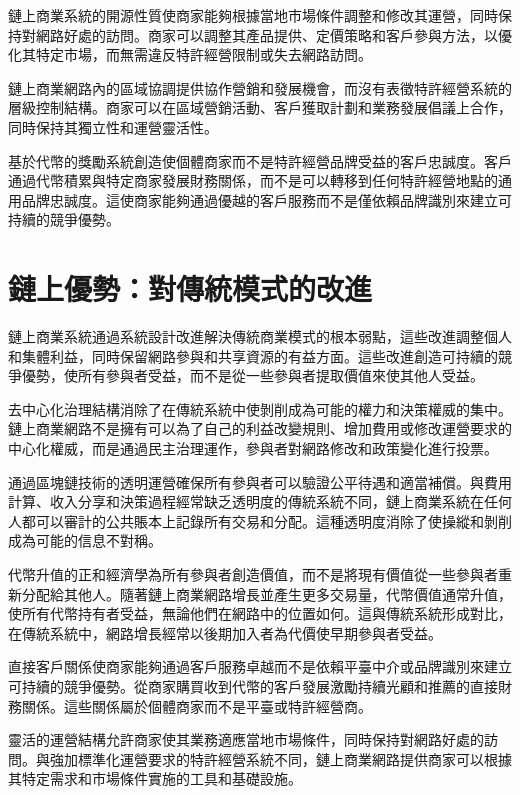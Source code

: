 \documentclass[
  Letterpaper,
]{scrbook}
\begin{document}
鏈上商業系統的開源性質使商家能夠根據當地市場條件調整和修改其運營，同時保持對網路好處的訪問。商家可以調整其產品提供、定價策略和客戶參與方法，以優化其特定市場，而無需違反特許經營限制或失去網路訪問。

鏈上商業網路內的區域協調提供協作營銷和發展機會，而沒有表徵特許經營系統的層級控制結構。商家可以在區域營銷活動、客戶獲取計劃和業務發展倡議上合作，同時保持其獨立性和運營靈活性。

基於代幣的獎勵系統創造使個體商家而不是特許經營品牌受益的客戶忠誠度。客戶通過代幣積累與特定商家發展財務關係，而不是可以轉移到任何特許經營地點的通用品牌忠誠度。這使商家能夠通過優越的客戶服務而不是僅依賴品牌識別來建立可持續的競爭優勢。

\section{鏈上優勢：對傳統模式的改進}\label{ux93c8ux4e0aux512aux52e2ux5c0dux50b3ux7d71ux6a21ux5f0fux7684ux6539ux9032}

鏈上商業系統通過系統設計改進解決傳統商業模式的根本弱點，這些改進調整個人和集體利益，同時保留網路參與和共享資源的有益方面。這些改進創造可持續的競爭優勢，使所有參與者受益，而不是從一些參與者提取價值來使其他人受益。

去中心化治理結構消除了在傳統系統中使剝削成為可能的權力和決策權威的集中。鏈上商業網路不是擁有可以為了自己的利益改變規則、增加費用或修改運營要求的中心化權威，而是通過民主治理運作，參與者對網路修改和政策變化進行投票。

通過區塊鏈技術的透明運營確保所有參與者可以驗證公平待遇和適當補償。與費用計算、收入分享和決策過程經常缺乏透明度的傳統系統不同，鏈上商業系統在任何人都可以審計的公共賬本上記錄所有交易和分配。這種透明度消除了使操縱和剝削成為可能的信息不對稱。

代幣升值的正和經濟學為所有參與者創造價值，而不是將現有價值從一些參與者重新分配給其他人。隨著鏈上商業網路增長並產生更多交易量，代幣價值通常升值，使所有代幣持有者受益，無論他們在網路中的位置如何。這與傳統系統形成對比，在傳統系統中，網路增長經常以後期加入者為代價使早期參與者受益。

直接客戶關係使商家能夠通過客戶服務卓越而不是依賴平臺中介或品牌識別來建立可持續的競爭優勢。從商家購買收到代幣的客戶發展激勵持續光顧和推薦的直接財務關係。這些關係屬於個體商家而不是平臺或特許經營商。

靈活的運營結構允許商家使其業務適應當地市場條件，同時保持對網路好處的訪問。與強加標準化運營要求的特許經營系統不同，鏈上商業網路提供商家可以根據其特定需求和市場條件實施的工具和基礎設施。
\end{document}
